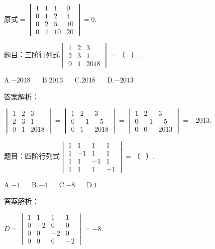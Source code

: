 $\mathrm{原式}=\begin{vmatrix}1&1&1&0\\0&1&2&4\\0&2&5&10\\0&4&10&20\end{vmatrix}=0.$



题目：$\mathrm{三阶行列式}\begin{vmatrix}1&2&3\\2&3&1\\0&1&2018\end{vmatrix}=（\;\;\;）.$

A.$-2018$ $\quad$ B.$2013$ $\quad$ C.$2018$ $\quad$ D.$-2013$

答案解析：

$\begin{vmatrix}1&2&3\\2&3&1\\0&1&2018\end{vmatrix}=\begin{vmatrix}1&2&3\\0&-1&-5\\0&1&2018\end{vmatrix}=\begin{vmatrix}1&2&3\\0&-1&-5\\0&0&2013\end{vmatrix}=-2013.$



题目：$\mathrm{四阶行列式}\begin{vmatrix}1&1&1&1\\1&-1&1&1\\1&1&-1&1\\1&1&1&-1\end{vmatrix}=（\;\;\;）.\;$

A.$-1$ $\quad$ B.$-4$ $\quad$ C.$-8$ $\quad$ D.$1$

答案解析：

$D\overset{}=\begin{vmatrix}1&1&1&1\\0&-2&0&0\\0&0&-2&0\\0&0&0&-2\end{vmatrix}=-8.$